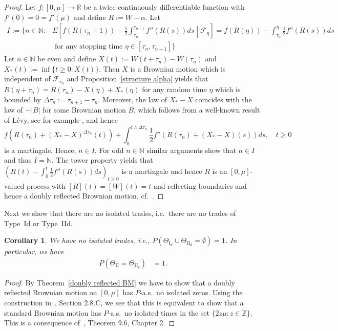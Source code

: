 \documentclass[11pt]{scrartcl}
\newtheorem{corollary}[theorem]{Corollary}
\begin{document}
\begin{proof}
Let $f:[0,\mu]\rightarrow\mathbb R$ be a twice continuously differentiable 
function with $f'(0)=0=f'(\mu)$ and define $R:=W-\alpha$. Let
 \begin{align*} 
 I:=\Bigg\{n\in\mathbb N: & \textstyle E\left[f(R(\tau_n+1))-\frac12\int_{\tau_n}^{\tau_{n+1}}f''(R(s))ds \middle\vert\mathcal F_{\eta}\right] = 
 f(R(\eta))-\int_{\tau_n}^{\eta}\frac{1}{2}f''(R(s))ds \\ 
  &\text{ for any stopping time }\eta\in[\tau_n,\tau_{n+1}]\Bigg\}
 \end{align*}
Let $n\in \mathbb N$ be even and define $X(t) := W(t+\tau_n)-W(\tau_n)$ 
and $X_\ast(t):=\inf\{t\geq0:X(t)\}$. Then $X$ is a Brownian motion which 
is independent of $\mathcal F_{\tau_n}$ and Proposition~\ref{structure alpha} 
yields that $R(\eta+\tau_n) = R(\tau_n)-X(\eta)+X_\ast(\eta)$ for any random 
time $\eta$ which is bounded by $\Delta\tau_n:=\tau_{n+1}-\tau_n$. Moreover, the 
law of $X_\ast-X$ coincides with the law of $-|B|$ for some Brownian motion $B$, which follows from
a well-known result of L\'evy, see for example \cite[Thm.VI.2.3, p.240]{RY},  and hence 
$$ f(R(\tau_n)+(X_\ast-X)^{\Delta\tau_n}(t)) + \int_0^{t\wedge\Delta\tau_n} \frac{1}{2} f''(R(\tau_n)+(X_\ast-X)(s)) ds,\quad t\geq 0$$
is a martingale. Hence, $n\in I$.
For odd $n\in\mathbb N$ similar arguments show that $n\in I$ and thus $I=\mathbb N$. 
The tower property yields that $(R(t) - \int_0^t \frac{1}{2}f''(R(s)) ds)_{t\geq 0}$ is a 
martingale and hence $R$ is an $[0,\mu]$-valued process with $[R](t)=[W](t)=t$ and reflecting 
boundaries and hence a doubly reflected Brownian motion, cf.~\cite[p. 366]{ethier.kurtz.86}.
%
%
\end{proof}Next we show that there are no isolated trades, i.e.\ there are
no trades of Type~{Id} or Type~{IId}.

\begin{corollary}
\label{no isolated trades}We have no isolated trades, i.e., 
$P(\Theta_{\mathrm{I}_d}\cup\Theta_{\mathrm{II}_d}=\emptyset)=1$. 
In particular, we have 
\begin{align*}
P(\Theta_{\mathrm{II}} = \Theta_{\mathrm{II}_c}) &= 1.
\end{align*}
\end{corollary}

\begin{proof}
By Theorem~\ref{doubly reflected BM} we have to show that a doubly
reflected Brownian motion on $[0,\mu]$ has $P$-a.s.\ no isolated zeros. Using
the construction in~\cite{KS}, Section 2.8.C, we see that this is equivalent to show that a standard Brownian motion
has $P$-a.s.\ no isolated times in the set $\{2z\mu:z\in\mathbb{Z}\}$. This is
a consequence of~\cite{KS}, Theorem 9.6, Chapter 2.
\end{proof}
\end{document}
